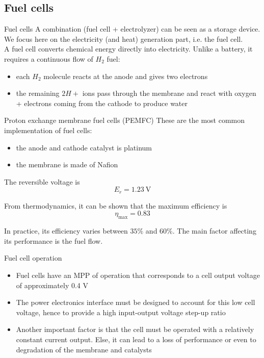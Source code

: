 \subsection{Fuel cells}
\begin{frame}{Fuel cells}
A combination (fuel cell + electrolyzer) can be seen as a storage device.\\
We focus here on the electricity (and heat) generation part, i.e. the fuel cell.\\
A fuel cell converts chemical energy directly into electricity. Unlike a battery, it requires a continuous flow of $H_{2}$ fuel:

\begin{itemize}
  \item each $H_{2}$ molecule reacts at the anode and gives two electrons
  \item the remaining $2 H+$ ions pass through the membrane and react with oxygen + electrons coming from the cathode to produce water
\end{itemize}

\end{frame}\begin{frame}{Proton exchange membrane fuel cells (PEMFC)}
These are the most common implementation of fuel cells:

\begin{itemize}
  \item the anode and cathode catalyst is platinum
  \item the membrane is made of Nafion
\end{itemize}

The reversible voltage is
$$
E_{r}=1.23 \mathrm{~V}
$$

From thermodynamics, it can be shown that the maximum efficiency is
$$
\eta_{\max }=0.83
$$

In practice, its efficiency varies between $35 \%$ and $60 \%$. The main factor affecting its performance is the fuel flow.

\end{frame}\begin{frame}{Fuel cell operation}
\begin{itemize}
  \item Fuel cells have an MPP of operation that corresponds to a cell output voltage of approximately 0.4 V
  \item The power electronics interface must be designed to account for this low cell voltage, hence to provide a high input-output voltage step-up ratio
  \item Another important factor is that the cell must be operated with a relatively constant current output. Else, it can lead to a loss of performance or even to degradation of the membrane and catalysts
\end{itemize}


\end{frame}
